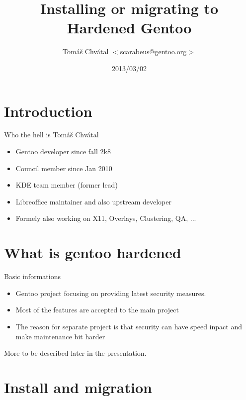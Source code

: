 \documentclass{beamer}
\title{Installing or migrating to Hardened Gentoo}
\author[Tomáš Chvátal]{Tomáš Chvátal $<$scarabeus@gentoo.org$>$}
\date{2013/03/02}
\begin{document}
\frame{\titlepage}
\section{Introduction}
\begin{frame}{Who the hell is Tomáš Chvátal}
	\begin{itemize}
		\item Gentoo developer since fall 2k8
		\item Council member since Jan 2010
		\item KDE team member (former lead)
		\item Libreoffice maintainer and also upstream developer
		\item Formely also working on X11, Overlays, Clustering, QA, ...
	\end{itemize}
\end{frame}
\section{What is gentoo hardened}

\begin{frame}{Basic informations}
	\begin{itemize}
		\item Gentoo project focusing on providing latest security measures.
		\item Most of the features are accepted to the main project
		\item The reason for separate project is that security can have speed inpact and make maintenance bit harder
	\end{itemize}
	\begin{center}More to be described later in the presentation.\end{center}
\end{frame}

\section{Install and migration}
\end{document}
